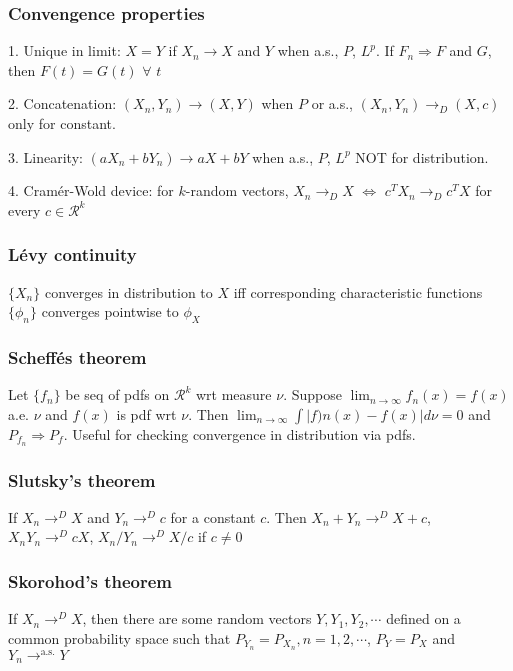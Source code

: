 \subsubsection{Convengence properties}

1. Unique in limit: $X=Y$ if $X_n\rightarrow X$ and $Y$ when a.s., $P$, $L^p$. If $F_n\Rightarrow F$ and $G$, then $F(t)=G(t)$ $\forall$ $t$

2. Concatenation: $(X_n, Y_n) \rightarrow (X, Y)$ when $P$ or a.s., $(X_n, Y_n)\rightarrow_D (X, c)$ only for constant.

3. Linearity: $(aX_n+bY_n)\rightarrow aX+bY$ when a.s., $P$, $L^p$ NOT for distribution.

4. Cramér-Wold device: for $k$-random vectors, $X_n\rightarrow_D X$ $\Leftrightarrow$ $c^TX_n\rightarrow_D c^T X$ for every $c\in\mathcal{R}^k$

\subsubsection{Lévy continuity}
$\{X_n\}$ converges in distribution to $X$ iff corresponding characteristic functions $\{\phi_n\}$ converges pointwise to $\phi_X$

\subsubsection{Scheffés theorem} Let $\{f_n\}$ be seq of pdfs on $\mathcal{R}^k$ wrt measure $\nu$. Suppose $\lim_{n\rightarrow\infty} f_n(x)=f(x)$ a.e. $\nu$ and $f(x)$ is pdf wrt $\nu$. Then $\lim_{n\rightarrow\infty} \int |f)n(x) - f(x)|d\nu=0$ and $P_{f_n} \Rightarrow P_f$. Useful for checking convergence in distribution via pdfs.

\subsubsection{Slutsky's theorem}

If $X_n\rightarrow^D X$ and $Y_n \rightarrow^D c$ for a constant $c$. Then
$X_n + Y_n \rightarrow^D X + c$, $X_nY_n \rightarrow^D cX$, $X_n/Y_n \rightarrow^D X/c$ if $c\neq0$

\subsubsection{Skorohod's theorem} If $X_n\rightarrow^D X$, then there are some random vectors $Y, Y_1, Y_2, \cdots$ defined on a common probability space such that $P_{Y_n}=P_{X_n}, n=1, 2, \cdots$, $P_Y=P_X$ and $Y_n\rightarrow^{\text{a.s.}}Y$

